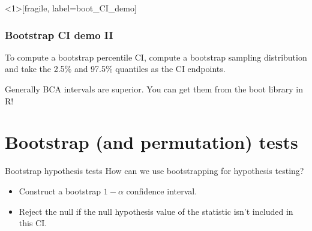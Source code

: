 \documentclass{beamer} %
\begin{document}

\begin{frame}<1>[fragile, label=boot_CI_demo]
\frametitle{Bootstrap CI demo II}
\begin{figure}
\centering
{}
\end{figure}
\end{frame}

\begin{frame}[standout]
To compute a bootstrap percentile CI, compute a bootstrap sampling distribution and take the 2.5\% and 97.5\% quantiles as the CI endpoints.
\end{frame}


\begin{frame}[standout]
Generally BCA intervals are superior. You can get them from the boot library in R!
\end{frame}


\section{Bootstrap (and permutation) tests}

\begin{frame}[standout]
\vspace{1em}
\end{frame}

\begin{frame}{Bootstrap hypothesis tests}
How can we use bootstrapping for hypothesis testing?
\begin{itemize}[<+(1)->]
\item Construct a bootstrap $1-\alpha$ confidence interval.
\item Reject the null if the null hypothesis value of the statistic isn't included in this CI.
\end{itemize}
\end{frame}
\end{document}
